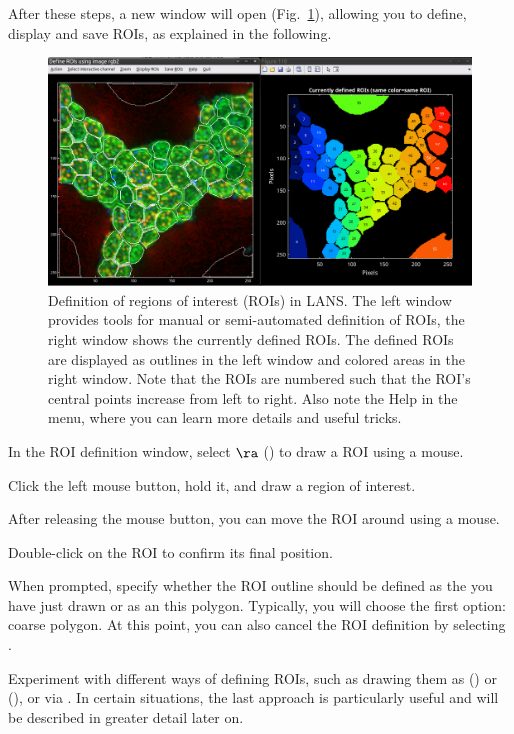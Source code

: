 \goldbox{}
After these steps, a new window will open (Fig.~\ref{fig:roi-definition-tool}), allowing you to define, display and save ROIs, as explained in the following.
\tcbe

\begin{figure}[!ht]
\centering
\includegraphics[width=\textwidth]{figs3/LANS-roi-definition-tool}
\caption{\label{fig:roi-definition-tool}%
Definition of regions of interest (ROIs) in LANS. The left window provides tools for manual or semi-automated definition of ROIs, the right window shows the currently defined ROIs. The defined ROIs are displayed as outlines in the left window and colored areas in the right window. Note that the ROIs are numbered such that the ROI's central points increase from left to right. Also note the Help in the menu, where you can learn more details and useful tricks.}
\end{figure}

\setcounter{step}{0}

\s In the ROI definition window, select  $\ra$  () to draw a ROI using a mouse.

\nb
\bul Click the left mouse button, hold it, and draw a region of interest. 

\bul After releasing the mouse button, you can move the ROI around using a mouse. 

\bul Double-click on the ROI to confirm its final position.

\bul When prompted, specify whether the ROI outline should be defined as the  you have just drawn or as an  this polygon. Typically, you will choose the first option: coarse polygon. At this point, you can also cancel the ROI definition by selecting .

\s Experiment with different ways of defining ROIs, such as drawing them as  () or  (), or via . In certain situations, the last approach is particularly useful and will be described in greater detail later on.

